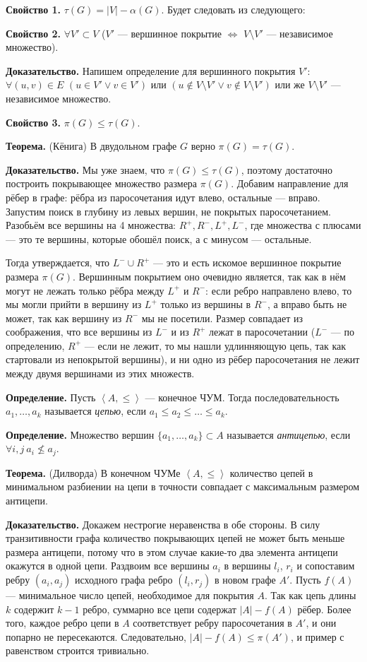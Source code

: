 \textbf{Свойство 1.} $\tau(G) = |V| - \alpha(G)$. Будет следовать из следующего:

\textbf{Свойство 2.} $\forall V' \subset V$ ($V'$ --- вершинное покрытие $\iff$ $V \setminus V'$ --- независимое множество).

\textbf{Доказательство.} Напишем определение для вершинного покрытия $V'$: $\forall (u, v) \in E$ $(u \in V' \vee v \in V')$ или $(u \not\in V \setminus V' \vee v \not\in V \setminus V')$ или же $V \setminus V'$ --- независимое множество.

\textbf{Свойство 3.} $\pi(G) \le \tau(G)$.

\textbf{Теорема.} (Кёнига) В двудольном графе $G$ верно $\pi(G) = \tau(G)$.

\textbf{Доказательство.} Мы уже знаем, что $\pi(G) \le \tau(G)$, поэтому достаточно построить покрывающее множество размера $\pi(G)$.
Добавим направление для рёбер в графе: рёбра из паросочетания идут влево, остальные --- вправо.
Запустим поиск в глубину из левых вершин, не покрытых паросочетанием.
Разобьём все вершины на 4 множества: $R^+, R^-, L^+, L^-$, где множества с плюсами --- это те вершины, которые обошёл поиск, а с минусом --- остальные.

Тогда утверждается, что $L^- \cup R^+$ --- это и есть искомое вершинное покрытие размера $\pi(G)$.
Вершинным покрытием оно очевидно является, так как в нём могут не лежать только рёбра между $L^+$ и $R^-$: если ребро направлено влево, то мы могли прийти в вершину из $L^+$ только из вершины в $R^-$, а вправо быть не может, так как вершину из $R^-$ мы не посетили.
Размер совпадает из соображения, что все вершины из $L^-$ и из $R^+$ лежат в паросочетании ($L^-$ --- по определению, $R^+$ --- если не лежит, то мы нашли удлинняющую цепь, так как стартовали из непокрытой вершины), и ни одно из рёбер паросочетания не лежит между двумя вершинами из этих множеств.

\textbf{Определение.} Пусть $\left<A, \le \right>$ --- конечное ЧУМ. Тогда последовательность $a_1, \dots, a_k$ называется \textit{цепью}, если $a_1 \le a_2 \le \dots \le a_k$.

\textbf{Определение.} Множество вершин $\{a_1, \dots, a_k\} \subset A$ называется \textit{антицепью}, если $\forall i, j~a_i \not\le a_j$.

\textbf{Теорема.} (Дилворда) В конечном ЧУМе $\left< A, \le \right>$ количество цепей в минимальном разбиении на цепи в точности совпадает с максимальным размером антицепи.

\textbf{Доказательство.} Докажем нестрогие неравенства в обе стороны. В силу транзитивности графа количество покрывающих цепей не может быть меньше размера антицепи, потому что в этом случае какие-то два элемента антицепи окажутся в одной цепи.
Раздвоим все вершины $a_i$ в вершины $l_i$, $r_i$ и сопоставим ребру $(a_i, a_j)$ исходного графа ребро $(l_i, r_j)$ в новом графе $A'$.
Пусть $f(A)$ --- минимальное число цепей, необходимое для покрытия $A$.
Так как цепь длины $k$ содержит $k - 1$ ребро, суммарно все цепи содержат $|A| - f(A)$ рёбер.
Более того, каждое ребро цепи в $A$ соответствует ребру паросочетания в $A'$, и они попарно не пересекаются.
Следовательно, $|A| - f(A) \le \pi(A')$, и пример с равенством строится тривиально.

